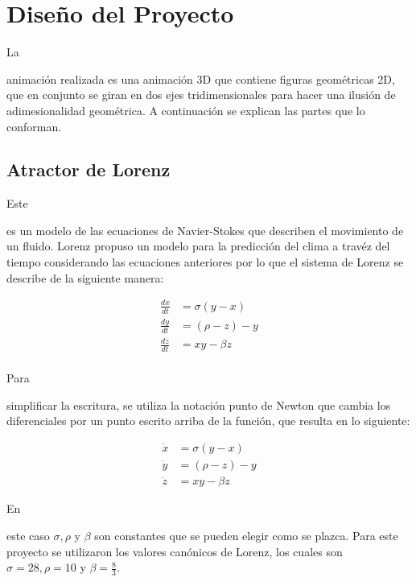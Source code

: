 \documentclass[stu, 12pt, letterpaper, donotrepeattitle, floatsintext]{apa7}
\begin{document}
    \section*{Diseño del Proyecto}
    La \begin{justifying}
      animación realizada es una animación 3D que contiene figuras geométricas 2D, que en conjunto se giran en dos ejes tridimensionales
    para hacer una ilusión de adimesionalidad geométrica. A continuación se explican las partes que lo conforman.\par
    \end{justifying}
    \vspace{\baselineskip}
    \subsection*{Atractor de Lorenz}
    Este \begin{justifying}
      es un modelo de las ecuaciones de Navier-Stokes que describen el movimiento de un fluido. Lorenz propuso un modelo para la predicción del clima
    a travéz del tiempo considerando las ecuaciones anteriores por lo que el sistema de Lorenz se describe de la siguiente manera:\par
    \end{justifying}
    \vspace*{-\abovedisplayskip}
    \begin{equation*}
      \begin{aligned}
        \frac{dx}{dt}&=\sigma (y-x)\\
        \frac{dy}{dt}&=(\rho-z)-y\\
        \frac{dz}{dt}&=xy-\beta z\\
      \end{aligned}
    \end{equation*}\par
    Para \begin{justifying}
      simplificar la escritura, se utiliza la notación punto de Newton que cambia los diferenciales por un punto escrito arriba de la función, que resulta en lo siguiente:\par
    \end{justifying}
    \vspace*{-\abovedisplayskip}
    \begin{equation*}
      \begin{aligned}
        \dot{x}&=\sigma (y-x)\\
        \dot{y}&=(\rho-z)-y\\
        \dot{z}&=xy-\beta z
      \end{aligned}
    \end{equation*}\par
    En \begin{justifying}
      este caso \(\sigma, \rho\) y \(\beta\) son constantes que se pueden elegir como se plazca. Para este proyecto se utilizaron los valores canónicos de Lorenz, los cuales
      son \(\sigma=28, \rho=10 \) y \(\beta=\frac{8}{3}\).\par
    \end{justifying}
    \vspace{\baselineskip}
\end{document}
